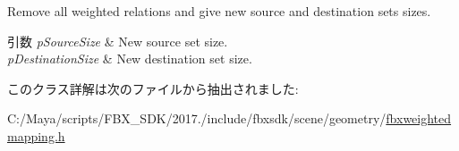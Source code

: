 Remove all weighted relations and give new source and destination sets sizes. 
\begin{DoxyParams}{引数}
{\em p\+Source\+Size} & New source set size. \\
\hline
{\em p\+Destination\+Size} & New destination set size. \\
\hline
\end{DoxyParams}


このクラス詳解は次のファイルから抽出されました\+:\begin{DoxyCompactItemize}
\item 
C\+:/\+Maya/scripts/\+F\+B\+X\+\_\+\+S\+D\+K/2017./include/fbxsdk/scene/geometry/\hyperlink{fbxweightedmapping_8h}{fbxweightedmapping.\+h}\end{DoxyCompactItemize}
